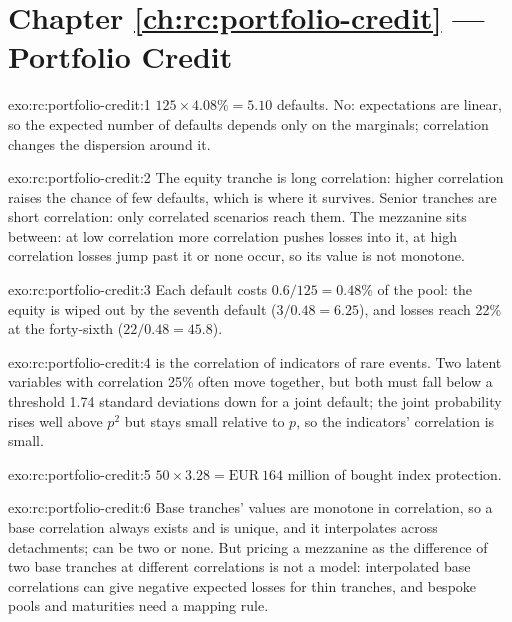 \section*{Chapter \ref{ch:rc:portfolio-credit} --- Portfolio Credit}

\begin{solution}{exo:rc:portfolio-credit:1}
$125\times4.08\% = 5.10$ defaults. No: expectations are linear, so the expected number of
defaults depends only on the marginals; correlation changes the dispersion around it.
\end{solution}

\begin{solution}{exo:rc:portfolio-credit:2}
The equity tranche is long correlation: higher correlation raises the chance of few
defaults, which is where it survives. Senior tranches are short correlation: only
correlated scenarios reach them. The mezzanine sits between: at low correlation more
correlation pushes losses into it, at high correlation losses jump past it or none occur,
so its value is not monotone.
\end{solution}

\begin{solution}{exo:rc:portfolio-credit:3}
Each default costs $0.6/125 = 0.48\%$ of the pool: the equity is wiped out by the seventh
default ($3/0.48 = 6.25$), and losses reach 22\% at the forty-sixth ($22/0.48 = 45.8$).
\end{solution}

\begin{solution}{exo:rc:portfolio-credit:4}
 is the correlation of indicators of rare events. Two latent variables
with correlation 25\% often move together, but both must fall below a threshold 1.74
standard deviations down for a joint default; the joint probability rises well above
$p^2$ but stays small relative to $p$, so the indicators' correlation is small.
\end{solution}

\begin{solution}{exo:rc:portfolio-credit:5}
$50\times3.28 = \text{EUR}~164$ million of bought index protection.
\end{solution}

\begin{solution}{exo:rc:portfolio-credit:6}
Base tranches' values are monotone in correlation, so a base correlation always exists and
is unique, and it interpolates across detachments;  can be two or
none. But pricing a mezzanine as the difference of two base tranches at different
correlations is not a model: interpolated base correlations can give negative expected
losses for thin tranches, and bespoke pools and maturities need a mapping rule.
\end{solution}

